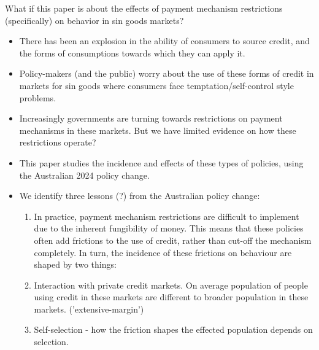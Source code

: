 \documentclass[11pt]{article}
\begin{document}
What if this paper is about  the effects of payment mechanism restrictions (specifically) on behavior in sin goods markets?
\begin{itemize}
    \item There has been an explosion in the ability of consumers to source credit, and the forms of consumptions towards which they can apply it. 
    \item Policy-makers (and the public) worry about the use of these forms of credit in markets for sin goods where consumers face temptation/self-control style problems. 
    \item Increasingly governments are turning towards restrictions on payment mechanisms in these markets. But we have limited evidence on how these restrictions operate?
    \item This paper studies the incidence and effects of these types of policies, using the Australian 2024 policy change. 
    \item We identify three lessons (?) from the Australian policy change:
        \begin{enumerate}
            \item In practice, payment mechanism restrictions are difficult to implement due to the inherent fungibility of money. This means that these policies often add frictions to the use of credit, rather than cut-off the mechanism completely. In turn, the incidence of these frictions on behaviour are shaped by two things: 
            \item Interaction with private credit markets. On average population of people using credit in these markets are different to broader population in these markets. ('extensive-margin')
            \item Self-selection - how the friction shapes the effected population depends on selection. 
        \end{enumerate}
\end{itemize}











\end{document}
